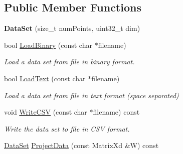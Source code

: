 \subsection*{Public Member Functions}
\begin{DoxyCompactItemize}
\item 
\hypertarget{struct_d_r_d_s_p_1_1_data_set_ab1fec22ab532a161837090408b0cfd8c}{{\bfseries Data\-Set} (size\-\_\-t num\-Points, uint32\-\_\-t dim)}\label{struct_d_r_d_s_p_1_1_data_set_ab1fec22ab532a161837090408b0cfd8c}

\item 
\hypertarget{struct_d_r_d_s_p_1_1_data_set_a0ffb95866863d3b2bad35b0c68c6c7f3}{bool \hyperlink{struct_d_r_d_s_p_1_1_data_set_a0ffb95866863d3b2bad35b0c68c6c7f3}{Load\-Binary} (const char $\ast$filename)}\label{struct_d_r_d_s_p_1_1_data_set_a0ffb95866863d3b2bad35b0c68c6c7f3}

\begin{DoxyCompactList}\small\item\em Load a data set from file in binary format. \end{DoxyCompactList}\item 
\hypertarget{struct_d_r_d_s_p_1_1_data_set_a9caf2a2c685f1433028de6d3c11bd758}{bool \hyperlink{struct_d_r_d_s_p_1_1_data_set_a9caf2a2c685f1433028de6d3c11bd758}{Load\-Text} (const char $\ast$filename)}\label{struct_d_r_d_s_p_1_1_data_set_a9caf2a2c685f1433028de6d3c11bd758}

\begin{DoxyCompactList}\small\item\em Load a data set from file in text format (space separated) \end{DoxyCompactList}\item 
\hypertarget{struct_d_r_d_s_p_1_1_data_set_a1d90f86c1fbe0380d91158b1c050c501}{void \hyperlink{struct_d_r_d_s_p_1_1_data_set_a1d90f86c1fbe0380d91158b1c050c501}{Write\-C\-S\-V} (const char $\ast$filename) const }\label{struct_d_r_d_s_p_1_1_data_set_a1d90f86c1fbe0380d91158b1c050c501}

\begin{DoxyCompactList}\small\item\em Write the data set to file in C\-S\-V format. \end{DoxyCompactList}\item 
\hypertarget{struct_d_r_d_s_p_1_1_data_set_a0f42640d4f826807b69830bf3617152c}{\hyperlink{struct_d_r_d_s_p_1_1_data_set}{Data\-Set} \hyperlink{struct_d_r_d_s_p_1_1_data_set_a0f42640d4f826807b69830bf3617152c}{Project\-Data} (const Matrix\-Xd \&W) const }\label{struct_d_r_d_s_p_1_1_data_set_a0f42640d4f826807b69830bf3617152c}


\end{DoxyCompactItemize}
